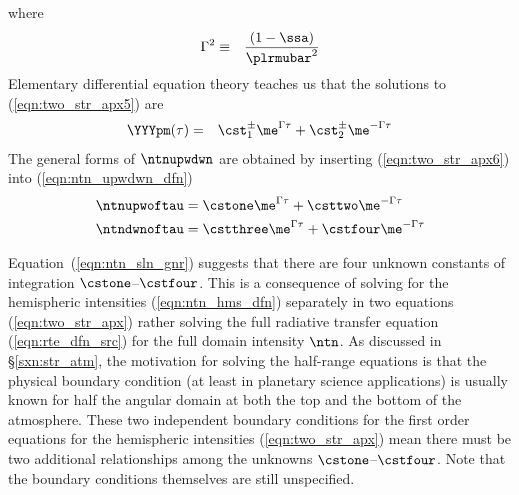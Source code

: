 \documentclass[12pt]{article}
\begin{document}
where
\begin{eqnarray}
\Gamma^{2} & \equiv & \frac{(1 - \ssa)}{\plrmubar^{2}}
\label{eqn:gmm_dfn}
\end{eqnarray}
Elementary differential equation theory teaches us that the solutions
to (\ref{eqn:two_str_apx5}) are 
\begin{eqnarray}
\YYYpm(\tau) & = & \cst^{\pm}_{1} \me^{\Gamma\tau} + \cst^{\pm}_{2} \me^{-\Gamma\tau}
\label{eqn:two_str_apx6}
\end{eqnarray}
The general forms of $\ntnupwdwn$ are obtained by inserting
(\ref{eqn:two_str_apx6}) into (\ref{eqn:ntn_upwdwn_dfn})
\begin{subequations}
\label{eqn:ntn_sln_gnr}
\begin{align}
\ntnupwoftau & = \cstone\me^{\Gamma\tau} + \csttwo\me^{-\Gamma\tau} \\
\ntndwnoftau & = \cstthree\me^{\Gamma\tau} + \cstfour\me^{-\Gamma\tau} 
\end{align}
\end{subequations} 

Equation~(\ref{eqn:ntn_sln_gnr}) suggests that there are four
unknown constants of integration $\cstone$--$\cstfour$.
This is a consequence of solving for the hemispheric intensities
(\ref{eqn:ntn_hms_dfn}) separately in two equations
(\ref{eqn:two_str_apx}) rather solving the full radiative transfer
equation (\ref{eqn:rte_dfn_src}) for the full domain intensity $\ntn$.
As discussed in \S\ref{sxn:str_atm}, the motivation for solving the
half-range equations is that the physical boundary condition 
(at least in planetary science applications) is usually known for half
the angular domain at both the top and the bottom of the atmosphere.
These two independent boundary conditions for the first order
equations for the hemispheric intensities (\ref{eqn:two_str_apx})
mean there must be two additional relationships among the unknowns
$\cstone$--$\cstfour$.
Note that the boundary conditions themselves are still unspecified.
\end{document}
